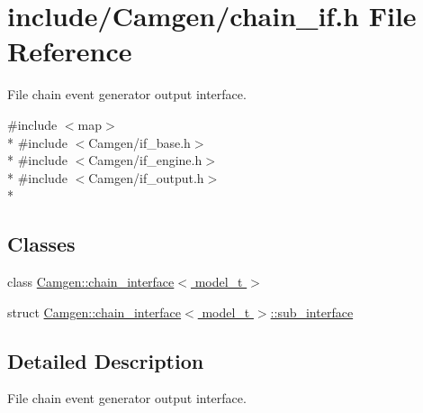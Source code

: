 \hypertarget{a00608}{}\section{include/\+Camgen/chain\+\_\+if.h File Reference}
\label{a00608}


File chain event generator output interface.  


{\ttfamily \#include $<$map$>$}\\*
{\ttfamily \#include $<$Camgen/if\+\_\+base.\+h$>$}\\*
{\ttfamily \#include $<$Camgen/if\+\_\+engine.\+h$>$}\\*
{\ttfamily \#include $<$Camgen/if\+\_\+output.\+h$>$}\\*
\subsection*{Classes}
\begin{DoxyCompactItemize}
\item 
class \hyperlink{a00060}{Camgen\+::chain\+\_\+interface$<$ model\+\_\+t $>$}
\item 
struct \hyperlink{a00525}{Camgen\+::chain\+\_\+interface$<$ model\+\_\+t $>$\+::sub\+\_\+interface}
\end{DoxyCompactItemize}


\subsection{Detailed Description}
File chain event generator output interface. 

